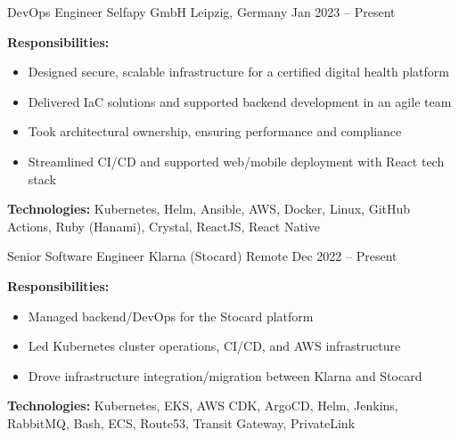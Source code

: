 
\begin{cventries}

\cventry
  {DevOps Engineer}
  {Selfapy GmbH}
  {Leipzig, Germany}
  {Jan 2023 – Present}
  {
    \begin{cvitems}
      \item {\textbf{Responsibilities:}
        \begin{itemize}
          \item Designed secure, scalable infrastructure for a certified digital health platform
          \item Delivered IaC solutions and supported backend development in an agile team
          \item Took architectural ownership, ensuring performance and compliance
          \item Streamlined CI/CD and supported web/mobile deployment with React tech stack\\
        \end{itemize}
      }
      \item {\textbf{Technologies:} Kubernetes, Helm, Ansible, AWS, Docker, Linux, GitHub Actions, Ruby (Hanami), Crystal, ReactJS, React Native}\\
    \end{cvitems}
  }

\cventry
  {Senior Software Engineer}
  {Klarna (Stocard)}
  {Remote}
  {Dec 2022 – Present}
  {
    \begin{cvitems}
      \item {\textbf{Responsibilities:}
        \begin{itemize}
          \item Managed backend/DevOps for the Stocard platform
          \item Led Kubernetes cluster operations, CI/CD, and AWS infrastructure
          \item Drove infrastructure integration/migration between Klarna and Stocard\\
        \end{itemize}
      }
      \item {\textbf{Technologies:} Kubernetes, EKS, AWS CDK, ArgoCD, Helm, Jenkins, RabbitMQ, Bash, ECS, Route53, Transit Gateway, PrivateLink}\\
    \end{cvitems}
  }


\end{cventries}
